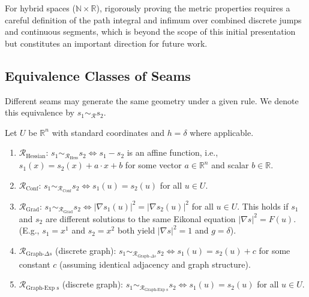 \documentclass[twoside,twocolumn]{article}
\begin{document}
\noindent For hybrid spaces (\( \mathbb{N} \times \mathbb{R} \)), rigorously proving the metric properties requires a careful definition of the path integral and infimum over combined discrete jumps and continuous segments, which is beyond the scope of this initial presentation but constitutes an important direction for future work.

\subsection{Equivalence Classes of Seams}

Different seams may generate the same geometry under a given rule. We denote this equivalence by \( s_1 \sim_{\mathcal{R}} s_2 \).

\begin{proposition} \label{prop:seam_equiv}
Let \( U \) be \( \mathbb{R}^n \) with standard coordinates and \( h=\delta \) where applicable.
\begin{enumerate}
    \item \( \mathcal{R}_{\text{Hessian}} \): \( s_1 \sim_{\mathcal{R}_{\text{Hess}}} s_2 \iff s_1 - s_2 \) is an affine function, i.e., \( s_1(x) = s_2(x) + a \cdot x + b \) for some vector \( a \in \mathbb{R}^n \) and scalar \( b \in \mathbb{R} \).
    \item \( \mathcal{R}_{\text{Conf}} \): \( s_1 \sim_{\mathcal{R}_{\text{Conf}}} s_2 \iff s_1(u) = s_2(u) \) for all \( u \in U \).
    \item \( \mathcal{R}_{\text{Grad}} \): \( s_1 \sim_{\mathcal{R}_{\text{Grad}}} s_2 \iff |\nabla s_1(u)|^2 = |\nabla s_2(u)|^2 \) for all \( u \in U \). This holds if \( s_1 \) and \( s_2 \) are different solutions to the same Eikonal equation \( |\nabla s|^2 = F(u) \). (E.g., \( s_1=x^1 \) and \( s_2=x^2 \) both yield \( |\nabla s|^2=1 \) and \( g=\delta \)).
    \item \( \mathcal{R}_{\text{Graph-}\Delta s} \) (discrete graph): \( s_1 \sim_{\mathcal{R}_{\text{Graph-}\Delta s}} s_2 \iff s_1(u) = s_2(u) + c \) for some constant \( c \) (assuming identical adjacency and graph structure).
    \item \( \mathcal{R}_{\text{Graph-Exp s}} \) (discrete graph): \( s_1 \sim_{\mathcal{R}_{\text{Graph-Exp s}}} s_2 \iff s_1(u) = s_2(u) \) for all \( u \in U \).
\end{enumerate}
\end{proposition}
\end{document}
